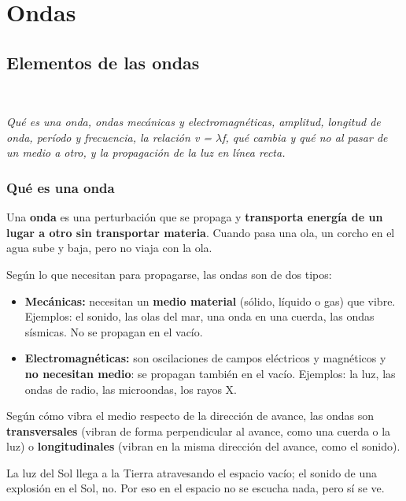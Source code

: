 \chapter{Ondas}
\section[Elementos de las ondas]{Elementos de las ondas}
\modcomun\ \ {\color{gris}\itshape Qué es una onda, ondas mecánicas y electromagnéticas, amplitud, longitud de onda, período y frecuencia, la relación v = \ensuremath{\lambda}f, qué cambia y qué no al pasar de un medio a otro, y la propagación de la luz en línea recta.\par}
\subsection{Qué es una onda}
Una \textbf{onda} es una perturbación que se propaga y \textbf{transporta energía de un lugar a otro sin transportar materia}. Cuando pasa una ola, un corcho en el agua sube y baja, pero no viaja con la ola.

 

Según lo que necesitan para propagarse, las ondas son de dos tipos:

 
\begin{itemize}
  \item \textbf{Mecánicas:} necesitan un \textbf{medio material} (sólido, líquido o gas) que vibre. Ejemplos: el sonido, las olas del mar, una onda en una cuerda, las ondas sísmicas. No se propagan en el vacío.
  \item \textbf{Electromagnéticas:} son oscilaciones de campos eléctricos y magnéticos y \textbf{no necesitan medio}: se propagan también en el vacío. Ejemplos: la luz, las ondas de radio, las microondas, los rayos X.
\end{itemize}
 

Según cómo vibra el medio respecto de la dirección de avance, las ondas son \textbf{transversales} (vibran de forma perpendicular al avance, como una cuerda o la luz) o \textbf{longitudinales} (vibran en la misma dirección del avance, como el sonido).

  
\begin{clave}[{Recuerda}] La luz del Sol llega a la Tierra atravesando el espacio vacío; el sonido de una explosión en el Sol, no. Por eso en el espacio no se escucha nada, pero sí se ve.\end{clave}
 
